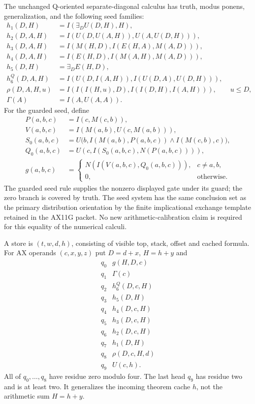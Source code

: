 The unchanged Q-oriented separate-diagonal calculus has truth, modus
ponens, generalization, and the following seed families:
\begin{align*}
 h_1(D,H)&=I(\exists_D U(D,H),H),\\
 h_2(D,A,H)&=I(U(D,U(A,H)),U(A,U(D,H))),\\
 h_3(D,A,H)&=I(M(H,D),I(E(H,A),M(A,D))),\\
 h_4(D,A,H)&=I(E(H,D),I(M(A,H),M(A,D))),\\
 h_5(D,H)&=\exists_D E(H,D),\\
 h_6^Q(D,A,H)&=I(U(D,I(A,H)),I(U(D,A),U(D,H))),\\
 \rho(D,A,H,u)&=I(I(I(H,u),D),I(I(D,H),I(A,H))),\qquad u\le D,\\
 \Gamma(A)&=I(A,U(A,A)).
\end{align*}
For the guarded seed, define
\begin{align*}
 P(a,b,c)&=I(c,M(c,b)),\\
 V(a,b,c)&=I(M(a,b),U(c,M(a,b))),\\
 S_0(a,b,c)&=U\bigl(b,I(M(a,b),P(a,b,c))\wedge I(M(c,b),c)\bigr),\\
 Q_0(a,b,c)&=U(c,I(S_0(a,b,c),N(P(a,b,c)))),\\
 g(a,b,c)&=\begin{cases}N(I(V(a,b,c),Q_0(a,b,c))),&c\ne a,b,\\
 0,&\text{otherwise.}\end{cases}
\end{align*}
The guarded seed rule supplies the nonzero displayed gate under its
guard; the zero branch is covered by truth. The seed system has the
same conclusion set as the primary distribution orientation by the
finite implicational exchange template retained in the AX11G packet.
No new arithmetic-calibration claim is required for this equality of
the numerical calculi.

A store is $(t,w,d,h)$, consisting of visible top, stack, offset and
cached formula. For AX operands $(c,x,y,z)$ put $D=d+x$, $H=h+y$ and
\[
\begin{array}{c|l}
q_0&g(H,D,c)\\q_1&\Gamma(c)\\q_2&h_6^Q(D,c,H)\\q_3&h_5(D,H)\\
q_4&h_4(D,c,H)\\q_5&h_3(D,c,H)\\q_6&h_2(D,c,H)\\
q_7&h_1(D,H)\\q_8&\rho(D,c,H,d)\\q_9&U(c,h).
\end{array}
\]
All of $q_0,\ldots,q_8$ have residue zero modulo four. The last head
$q_9$ has residue two and is at least two. It generalizes the incoming
theorem cache $h$, not the arithmetic sum $H=h+y$.

